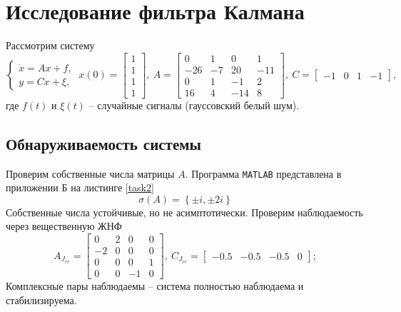 \documentclass[a4paper, 12pt]{article}
\begin{document}
    \section{Исследование фильтра Калмана}
    Рассмотрим систему
    $$
    \begin{cases}
        \dot{x}=Ax+f,\\
        y=Cx+\xi,
    \end{cases}\ x(0)=\begin{bmatrix}
        1\\1\\1\\1
    \end{bmatrix},\ A=\begin{bmatrix}
        0 &1 &0 &1\\
        -26 &-7 &20 &-11\\
        0 &1 &-1 &2\\
        16 &4 &-14 &8
    \end{bmatrix},\ C=\begin{bmatrix}
        -1 &0 &1 &-1
    \end{bmatrix},
    $$
    где $f(t)$ и $\xi(t)$ -- случайные сигналы (гауссовский белый шум).


    \subsection{Обнаруживаемость системы}
    Проверим собственные числа матрицы $A$. Программа \texttt{MATLAB} представлена
    в приложении Б на листинге \ref{task2}
    $$
    \sigma\left( A \right)=\left\{ \pm i,\pm2i \right\}
    $$
    Собственные числа устойчивые, но не асимптотически. Проверим наблюдаемость через
    вещественную ЖНФ
    $$
    A_{J_{re}}=\begin{bmatrix}
        0    &2   &0    &0\\
   -2   &0    &0   &0\\
    0   &0    &0    &1\\
   0   &0   &-1   &0
    \end{bmatrix},\ C_{J_{re}}=\begin{bmatrix}
        -0.5   &-0.5   &-0.5  &0
    \end{bmatrix};
    $$
    Комплексные пары наблюдаемы -- система полностью наблюдаема и стабилизируема.
\end{document}
